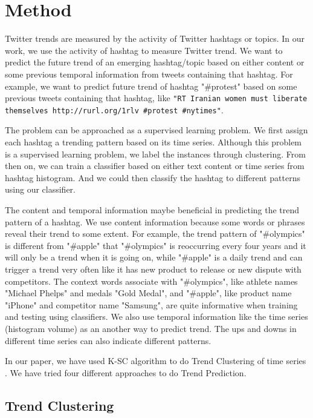 \documentclass{article}
\begin{document}
\section{Method}

Twitter trends are measured by the activity of Twitter hashtags or topics. In our work, we use the activity of hashtag to measure Twitter trend. We want to predict the future trend of an emerging hashtag/topic based on either content or some previous temporal information from tweets containing that hashtag. For example, we want to predict future trend of hashtag "\#protest" based on some previous tweets containing that hashtag, like \texttt{"RT Iranian women must liberate themselves http://rurl.org/1rlv \#protest \#nytimes"}.

The problem can be approached as a supervised learning problem. We first assign each hashtag a trending pattern based on its time series. Although this problem is a supervised learning problem, we label the instances through clustering. From then on, we can train a classifier based on either text content or time series from hashtag histogram. And we could then classify the hashtag to different patterns using our classifier. 

The content and temporal information maybe beneficial in predicting the trend pattern of a hashtag. We use content information because some words or phrases reveal their trend to some extent. For example, the trend pattern of "\#olympics" is different from "\#apple" that "\#olympics" is reoccurring every four years and it will only be a trend when it is going on, while "\#apple" is a daily trend and can trigger a trend very often like it has new product to release or new dispute with competitors. The context words associate with "\#olympics", like athlete names "Michael Phelps" and medals "Gold Medal", and "\#apple", like product name "iPhone" and competitor name "Samsung", are quite informative when training and testing using classifiers. We also use temporal information like the time series (histogram volume) as an another way to predict trend. The ups and downs in different time series can also indicate different patterns.      

In our paper, we have used K-SC algorithm to do Trend Clustering of time series \cite{Yang11}. We have tried four different approaches to do Trend Prediction.  

\subsection{Trend Clustering}
\end{document}
